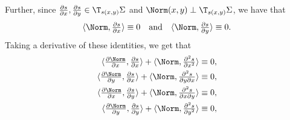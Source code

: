 Further, since $\tfrac{\partial s}{\partial x}, \tfrac{\partial s}{\partial y}\in\T_{s(x,y)}\Sigma$
and $\Norm(x,y)\perp\T_{s(x,y)}\Sigma$,
we have that
\[\langle \Norm,\tfrac{\partial s}{\partial x}\rangle\equiv 0
\quad\text{and}\quad
\langle \Norm,\tfrac{\partial s}{\partial y}\rangle\equiv 0.\]
Taking a derivative of these identities, we get that
\[\begin{aligned}
\langle \tfrac{\partial\Norm}{\partial x},\tfrac{\partial s}{\partial x}\rangle+\langle \Norm,\tfrac{\partial^2 s}{\partial x^2}\rangle&\equiv 0,
\\
\langle \tfrac{\partial\Norm}{\partial y},\tfrac{\partial s}{\partial x}\rangle+\langle \Norm,\tfrac{\partial^2 s}{\partial y\partial x}\rangle&\equiv 0,
\\
\langle \tfrac{\partial\Norm}{\partial x},\tfrac{\partial s}{\partial y}\rangle+\langle \Norm,\tfrac{\partial^2 s}{\partial x\partial y}\rangle&\equiv 0,
\\
\langle \tfrac{\partial\Norm}{\partial y},\tfrac{\partial s}{\partial y}\rangle+\langle \Norm,\tfrac{\partial^2 s}{\partial y^2}\rangle&\equiv 0,
\end{aligned}
\]

